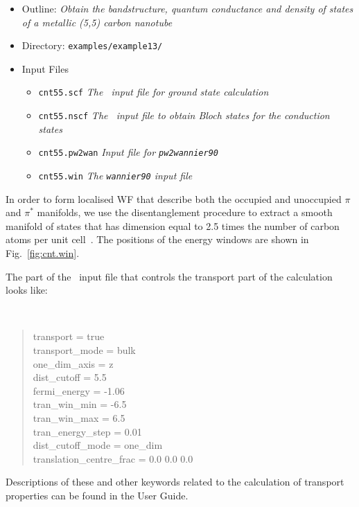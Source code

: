 \documentclass[a4paper,11pt,twoside]{article}
\begin{document}
\begin{itemize}
  \item{Outline: \it{Obtain the bandstructure, quantum conductance and
  density of states of a metallic (5,5) carbon nanotube}}
  \item{Directory: {\tt examples/example13/}}
  \item{Input Files}
    \begin{itemize}
      \item{ {\tt cnt55.scf}  {\it The \pwscf\ input file for ground state
	  calculation}}
      \item{ {\tt cnt55.nscf}  {\it The \pwscf\ input file to obtain Bloch
	  states for the conduction states}} 
      \item{ {\tt cnt55.pw2wan}  {\it Input file for {\tt pw2wannier90}}}
      \item{ {\tt cnt55.win}  {\it The {\tt wannier90} input file}}
    \end{itemize}
\end{itemize}

In order to form localised WF that describe both the occupied and
unoccupied $\pi$ and $\pi^{\ast}$ manifolds, we use the
disentanglement procedure to extract a smooth manifold of states that
has dimension equal to 2.5 times the number of carbon atoms per unit
cell~\cite{WanTran}. The positions of the energy windows are shown in
Fig.~\ref{fig:cnt.win}.

The part of the \wannier\ input file that controls the transport part
of the calculation looks like:

{\tt
\begin{quote}
transport                 = true\\
transport\_mode           = bulk\\
one\_dim\_axis            = z\\
dist\_cutoff              =  5.5\\
fermi\_energy             = -1.06\\
tran\_win\_min            = -6.5\\
tran\_win\_max            = 6.5\\
tran\_energy\_step         = 0.01\\
dist\_cutoff\_mode        = one\_dim\\
translation\_centre\_frac = 0.0 0.0 0.0
\end{quote} }

Descriptions of these and other keywords related to the calculation of
transport properties can be found in the User Guide.
\end{document}
